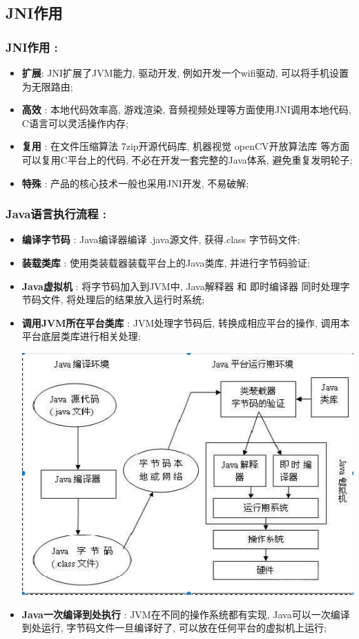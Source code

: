 \documentclass[9pt, b5paper]{article}
\begin{document}
\subsection{JNI作用}
\label{sec-1-3}
\subsubsection{JNI作用 :}
\label{sec-1-3-1}
\begin{itemize}
\item \textbf{扩展}: JNI扩展了JVM能力, 驱动开发, 例如开发一个wifi驱动, 可以将手机设置为无限路由;
\item \textbf{高效} : 本地代码效率高, 游戏渲染, 音频视频处理等方面使用JNI调用本地代码, C语言可以灵活操作内存;
\item \textbf{复用} : 在文件压缩算法 7zip开源代码库, 机器视觉 openCV开放算法库 等方面可以复用C平台上的代码, 不必在开发一套完整的Java体系, 避免重复发明轮子;
\item \textbf{特殊} : 产品的核心技术一般也采用JNI开发, 不易破解;
\end{itemize}
\subsubsection{Java语言执行流程 :}
\label{sec-1-3-2}
\begin{itemize}
\item \textbf{编译字节码} : Java编译器编译 .java源文件, 获得.class 字节码文件;
\item \textbf{装载类库} : 使用类装载器装载平台上的Java类库, 并进行字节码验证;
\item \textbf{Java虚拟机} : 将字节码加入到JVM中, Java解释器 和 即时编译器 同时处理字节码文件, 将处理后的结果放入运行时系统;
\item \textbf{调用JVM所在平台类库} : JVM处理字节码后, 转换成相应平台的操作, 调用本平台底层类库进行相关处理;

\includegraphics[width=.9\linewidth]{./pic/javaLanguage.png}

\item \textbf{Java一次编译到处执行} : JVM在不同的操作系统都有实现, Java可以一次编译到处运行, 字节码文件一旦编译好了, 可以放在任何平台的虚拟机上运行;
\end{itemize}
\end{document}
